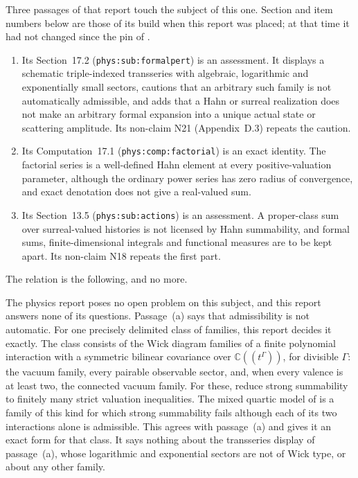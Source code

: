 \documentclass[11pt,letterpaper]{article}
\numberwithin{equation}{section}
\theoremstyle{definition}
\theoremstyle{remark}
\newcommand{\C}{\mathbb C}
\begin{document}
Three passages of that report touch the subject of this one. Section and
item numbers below are those of its build when this report was placed; at
that time it had not changed since the pin of .
\begin{enumerate}[label=\textup{(\alph*)}]
\item Its Section~17.2 (\texttt{phys:sub:formalpert}) is an assessment. It
displays a schematic triple-indexed transseries with algebraic, logarithmic
and exponentially small sectors, cautions that an arbitrary such family is
not automatically admissible, and adds that a Hahn or surreal realization
does not make an arbitrary formal expansion into a unique actual state or
scattering amplitude. Its non-claim N21 (Appendix~D.3) repeats the caution.
\item Its Computation~17.1 (\texttt{phys:comp:factorial}) is an exact
identity. The factorial series is a well-defined Hahn element at every
positive-valuation parameter, although the ordinary power series has zero
radius of convergence, and exact denotation does not give a real-valued sum.
\item Its Section~13.5 (\texttt{phys:sub:actions}) is an assessment. A
proper-class sum over surreal-valued histories is not licensed by Hahn
summability, and formal sums, finite-dimensional integrals and functional
measures are to be kept apart. Its non-claim N18 repeats the first part.
\end{enumerate}
The relation is the following, and no more.

The physics report poses no open problem on this subject, and this report
answers none of its questions. Passage~(a) says that admissibility is not
automatic. For one precisely delimited class of families, this report
decides it exactly. The class consists of the Wick diagram families of a
finite polynomial interaction with a symmetric bilinear covariance over
$\C((t^\Gamma))$, for divisible $\Gamma$: the vacuum family, every pairable
observable sector, and, when every valence is at least two, the connected
vacuum family. For these,  reduce
strong summability to finitely many strict valuation inequalities. The
mixed quartic model of  is a family of this kind for
which strong summability fails although each of its two interactions alone
is admissible. This agrees with passage~(a) and gives it an exact form for
that class. It says nothing about the transseries display of passage~(a),
whose logarithmic and exponential sectors are not of Wick type, or about any
other family.
\end{document}
